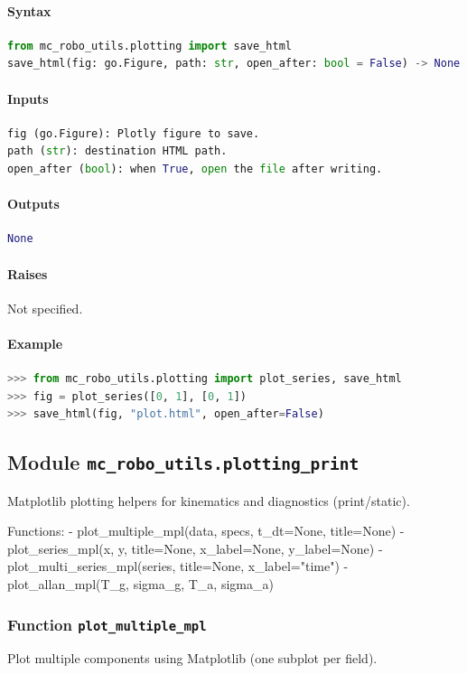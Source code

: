 \documentclass[11pt]{article}
\begin{document}
\paragraph{Syntax}
\begin{lstlisting}[language=Python]
from mc_robo_utils.plotting import save_html
save_html(fig: go.Figure, path: str, open_after: bool = False) -> None
\end{lstlisting}
\paragraph{Inputs}
\begin{lstlisting}[language=Python]
fig (go.Figure): Plotly figure to save.
path (str): destination HTML path.
open_after (bool): when True, open the file after writing.
\end{lstlisting}
\paragraph{Outputs}
\begin{lstlisting}[language=Python]
None
\end{lstlisting}
\paragraph{Raises}
Not specified.
\paragraph{Example}
\begin{lstlisting}[language=Python]
>>> from mc_robo_utils.plotting import plot_series, save_html
>>> fig = plot_series([0, 1], [0, 1])
>>> save_html(fig, "plot.html", open_after=False)
\end{lstlisting}

\subsection{Module \texttt{mc\_robo\_utils.plotting\_print}}
Matplotlib plotting helpers for kinematics and diagnostics (print/static).

Functions:
- plot\_multiple\_mpl(data, specs, t\_dt=None, title=None)
- plot\_series\_mpl(x, y, title=None, x\_label=None, y\_label=None)
- plot\_multi\_series\_mpl(series, title=None, x\_label="time")
- plot\_allan\_mpl(T\_g, sigma\_g, T\_a, sigma\_a)

\subsubsection{Function \texttt{plot\_multiple\_mpl}}
Plot multiple components using Matplotlib (one subplot per field).
\end{document}
